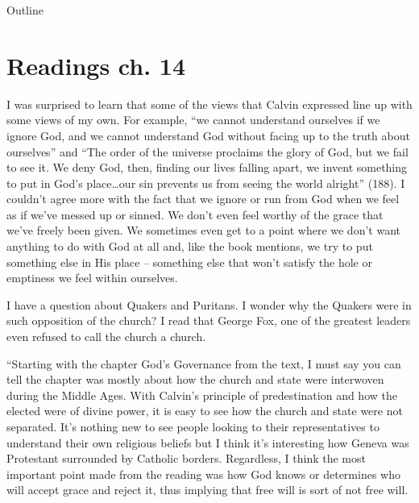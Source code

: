 

\maketitle
\begin{frame}{Outline}
\setcounter{tocdepth}{1}
\tableofcontents
\end{frame}

\section{Readings ch. 14}
\label{sec-1}
\begin{frame}[label=sec-1-1]{}
I was surprised to learn that some of the views that Calvin expressed line up with some views of my own. For example, ``we cannot understand ourselves if we ignore God, and we cannot understand God without facing up to the truth about ourselves'' and ``The order of the universe proclaims the glory of God, but we fail to see it. We deny God, then, finding our lives falling apart, we invent something to put in God's place\ldots{}our sin prevents us from seeing the world alright'' (188). I couldn't agree more with the fact that we ignore or run from God when we feel as if we've messed up or sinned. We don't even feel worthy of the grace that we've freely been given. We sometimes even get to a point where we don't want anything to do with God at all and, like the book mentions, we try to put something else in His place -- something else that won't satisfy the hole or emptiness we feel within ourselves. 
\end{frame}

\begin{frame}[label=sec-1-2]{}
I have a question about Quakers and Puritans. I wonder why the Quakers were in such opposition of the church? I read that George Fox, one of the greatest leaders even refused to call the church a church.
\end{frame}

\begin{frame}[label=sec-1-3]{}
``Starting with the chapter God's Governance from the text, I must say you can tell the chapter was mostly about how the church and state were interwoven during the Middle Ages. With Calvin's principle of predestination and how the elected were of divine power, it is easy to see how the church and state were not separated. It's nothing new to see people looking to their representatives to understand their own religious beliefs but I think it's interesting how Geneva was Protestant surrounded by Catholic borders. Regardless, I think the most important point made from the reading was how God knows or determines who will accept grace and reject it, thus implying that free will is sort of not free will. 
\end{frame}

